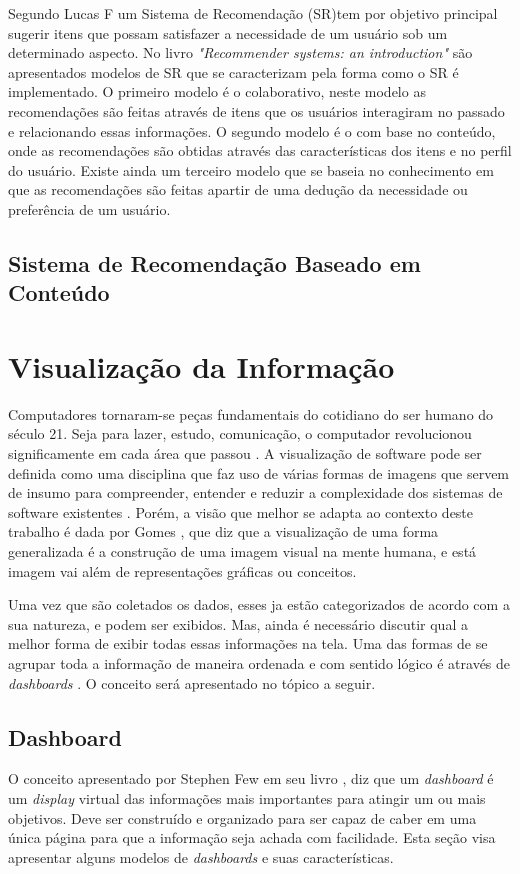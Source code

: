 Segundo Lucas F \cite{brunialti2015aprendizado} um Sistema de Recomendação (SR)tem por objetivo principal sugerir itens que possam satisfazer a necessidade de um usuário sob um determinado aspecto. No livro \textit{"Recommender systems: an introduction"} \cite{jannach2010recommender} são apresentados modelos de SR que se caracterizam pela forma como o SR é implementado. O primeiro modelo é o colaborativo, neste modelo as recomendações são feitas através de itens que os usuários interagiram no passado e relacionando essas informações. O segundo modelo é o com base no conteúdo, onde as recomendações são obtidas através das características dos itens e no perfil do usuário. Existe ainda um terceiro modelo que se baseia no conhecimento em que as recomendações são feitas apartir de uma dedução da necessidade ou preferência de um usuário.

\subsection*{Sistema de Recomendação Baseado em Conteúdo}


\section{Visualização da Informação}
Computadores tornaram-se peças fundamentais do cotidiano do ser humano do século 21. Seja para lazer, estudo, comunicação, o computador revolucionou significamente em cada área que passou \cite{hasan_humancomputer_2014}.
A visualização de software pode ser definida como uma disciplina que faz uso de várias formas de imagens que servem de insumo para compreender, entender e reduzir a complexidade dos sistemas de software existentes \cite{gracanin_software_2005}. Porém, a visão que melhor se adapta ao contexto deste trabalho é dada por Gomes \cite{gomes_percepcao_2011}, que diz que a visualização de uma forma generalizada é a construção de uma imagem visual na mente humana, e está imagem vai além de representações gráficas ou conceitos.

Uma vez que são coletados os dados, esses ja estão categorizados de acordo com a sua natureza, e podem ser exibidos. Mas, ainda é necessário discutir qual a melhor forma de exibir  todas essas informações na tela. Uma das formas de se agrupar toda a informação de maneira ordenada e com sentido lógico é através de \textit{dashboards} \cite{book_design}. O conceito será apresentado no tópico a seguir.


\subsection{Dashboard}
O conceito apresentado por Stephen Few em seu livro \cite{book_design}, diz que um \textit{dashboard} é um \textit{display} virtual das informações mais importantes para atingir um ou mais objetivos. Deve ser construído e organizado para ser capaz de caber em uma única página para que a informação seja achada com facilidade. Esta seção visa apresentar alguns modelos de \textit{dashboards} e suas características.

